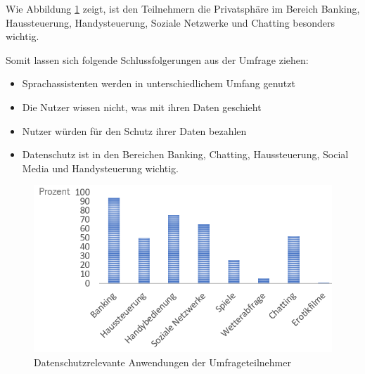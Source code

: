 Wie Abbildung \ref{fig:umfrage_anwendung} zeigt, ist den Teilnehmern die Privatsphäre im Bereich Banking, Haussteuerung, Handysteuerung, Soziale Netzwerke und Chatting besonders wichtig.

Somit lassen sich folgende Schlussfolgerungen aus der Umfrage ziehen:
\begin{itemize}	
	\item Sprachassistenten werden in unterschiedlichem Umfang genutzt
	\item Die Nutzer wissen nicht, was mit ihren Daten geschieht
	\item Nutzer würden für den Schutz ihrer Daten bezahlen
	\item Datenschutz ist in den Bereichen Banking, Chatting, Haussteuerung, Social Media und Handysteuerung wichtig.
\end{itemize}

\begin{figure}[!h]
	\centering
	\includegraphics[width=0.9\linewidth]{Picture/umfrage_anwendung}
	\caption[Datenschutzrelevante Anwendungen der Umfrageteilnehmers]{Datenschutzrelevante Anwendungen der Umfrageteilnehmer}
	\label{fig:umfrage_anwendung}
\end{figure}
